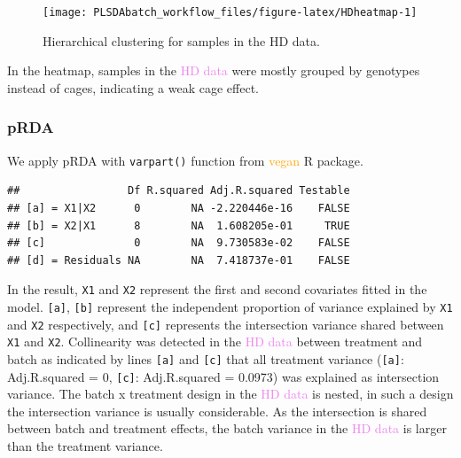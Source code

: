 \documentclass[
]{book}
\newenvironment{Shaded}{\begin{snugshade}}{\end{snugshade}}
\newcommand{\AttributeTok}[1]{\textcolor[rgb]{0.77,0.63,0.00}{#1}}
\newcommand{\FunctionTok}[1]{\textcolor[rgb]{0.00,0.00,0.00}{#1}}
\newcommand{\NormalTok}[1]{#1}
\newcommand{\OtherTok}[1]{\textcolor[rgb]{0.56,0.35,0.01}{#1}}
\newcommand{\SpecialCharTok}[1]{\textcolor[rgb]{0.00,0.00,0.00}{#1}}
\begin{document}
\begin{figure}

{\centering \texttt{[image: PLSDAbatch\_workflow\_files/figure-latex/HDheatmap-1]} 

}

\caption{Hierarchical clustering for samples in the HD data.}\label{fig:HDheatmap}
\end{figure}

In the heatmap, samples in the \textcolor{violet}{HD data} were mostly grouped by genotypes instead of cages, indicating a weak cage effect.

\hypertarget{prda-3}{%
\subsubsection{pRDA}\label{prda-3}}

We apply pRDA with \texttt{varpart()} function from \textcolor{orange}{vegan} R package.

\begin{Shaded}
\end{Shaded}

\begin{verbatim}
##                 Df R.squared Adj.R.squared Testable
## [a] = X1|X2      0        NA -2.220446e-16    FALSE
## [b] = X2|X1      8        NA  1.608205e-01     TRUE
## [c]              0        NA  9.730583e-02    FALSE
## [d] = Residuals NA        NA  7.418737e-01    FALSE
\end{verbatim}

In the result, \texttt{X1} and \texttt{X2} represent the first and second covariates fitted in the model. \texttt{{[}a{]}}, \texttt{{[}b{]}} represent the independent proportion of variance explained by \texttt{X1} and \texttt{X2} respectively, and \texttt{{[}c{]}} represents the intersection variance shared between \texttt{X1} and \texttt{X2}. Collinearity was detected in the \textcolor{violet}{HD data} between treatment and batch as indicated by lines \texttt{{[}a{]}} and \texttt{{[}c{]}} that all treatment variance (\texttt{{[}a{]}}: Adj.R.squared = 0, \texttt{{[}c{]}}: Adj.R.squared = 0.0973) was explained as intersection variance. The batch x treatment design in the \textcolor{violet}{HD data} is nested, in such a design the intersection variance is usually considerable. As the intersection is shared between batch and treatment effects, the batch variance in the \textcolor{violet}{HD data} is larger than the treatment variance.
\end{document}
